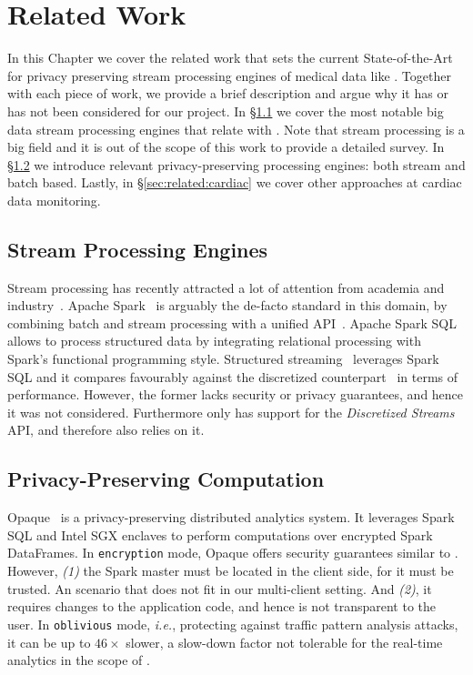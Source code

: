 \chapter{Related Work} \label{chap:related-work}

In this Chapter we cover the related work that sets the current State-of-the-Art for privacy preserving stream processing engines of medical data like \projName.
Together with each piece of work, we provide a brief description and argue why it has or has not been considered for our project.
In \S\ref{sec:related:stream} we cover the most notable big data stream processing engines that relate with \projName.
Note that stream processing is a big field and it is out of the scope of this work to provide a detailed survey.
In \S\ref{sec:related:privacy} we introduce relevant privacy-preserving processing engines: both stream and batch based.
Lastly, in \S\ref{sec:related:cardiac} we cover other approaches at cardiac data monitoring.

\section{Stream Processing Engines} \label{sec:related:stream}

Stream processing has recently attracted a lot of attention from academia and industry~\cite{Koliousis2016,Miao2017,Venkataraman2017}.
Apache Spark~\cite{Zaharia2012} is arguably the de-facto standard in this domain, by combining batch and stream processing with a unified API~\cite{ZahariaDStreams2012}.
Apache Spark SQL~\cite{Armbrust2015} allows to process structured data by integrating relational processing with Spark's functional programming style.
Structured streaming~\cite{Armbrust2018} leverages Spark SQL and it compares favourably against the discretized counterpart~\cite{ZahariaDStreams2012} in terms of performance. %
However, the former lacks security or privacy guarantees, and hence it was not considered.
Furthermore \sgxspark only has support for the \textit{Discretized Streams} API, and therefore \projName also relies on it.

\section{Privacy-Preserving Computation} \label{sec:related:privacy}

Opaque~\cite{Zheng2017} is a privacy-preserving distributed analytics system.
It leverages Spark SQL and Intel SGX enclaves to perform computations over encrypted Spark DataFrames.
In \texttt{encryption} mode, Opaque offers security guarantees similar to \projName.
However, \emph{(1)} the Spark master must be located in the client side, for it must be trusted. 
An scenario that does not fit in our multi-client setting.
And \emph{(2)}, it requires changes to the application code, and hence is not transparent to the user.
In \texttt{oblivious} mode, \emph{i.e.}, protecting against traffic pattern analysis attacks, it can be up to $46\times$ slower, a slow-down factor not tolerable for the real-time analytics in the scope of \projName.

